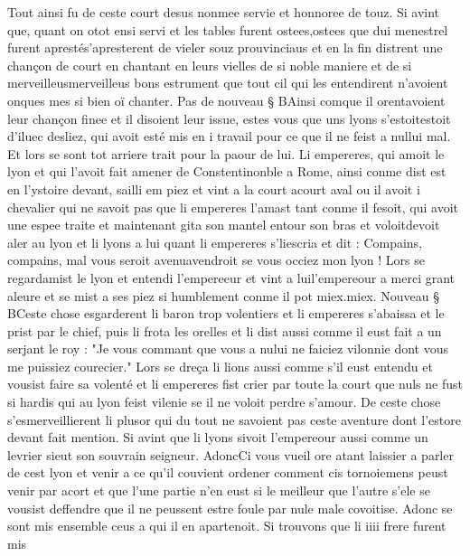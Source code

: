 \documentclass{article}
\begin{document}
\begin{pages}
   Tout ainsi fu de ceste court desus nonmee servie et honnoree de touz. 
   Si avint que, quant on otot ensi servi et les tables furent 
   ostees,ostees que
   dui menestrel furent aprestés'apresterent de vieler souz prouvinciaus 
   et en la fin distrent une chançon de court en chantant en leurs vielles de si noble maniere et 
   de si merveilleusmerveilleus bons estrument que tout cil qui les entendirent 
   n’avoient onques mes si bien oï chanter. \pend
\pstart Pas de nouveau § BAinsi 
   comque il orentavoient
   leur chançon finee et il disoient leur issue, estes vous que uns lyons 
   s’estoitestoit d'iluec desliez,
   qui avoit esté mis en i travail pour ce que il ne feist a nullui mal.
   Et lors se sont tot arriere trait pour la paour de lui.
   Li empereres, qui amoit 
   le lyon et qui l’avoit 
   fait amener de Constentinonble a Rome, 
   ainsi conme dist est en l’ystoire devant, sailli em piez et vint a la 
   court acourt aval ou il avoit i chevalier qui ne savoit pas que
   li empereres l’amast tant conme il fesoit,
   qui avoit une espee traite et maintenant gita son mantel entour son bras et
   voloitdevoit aler au lyon et
   li lyons a lui quant
   li empereres s’liescria et dit :
   Compains, compains, mal vous seroit avenuavendroit
      se vous occiez mon lyon
          !
   Lors se regardamist le lyon 
   et entendi l’empereeur et 
   vint a luil'empereour a merci grant aleure 
   et se mist a ses piez si humblement conme il pot 
   miex.miex. Nouveau § BCeste chose esgarderent
   li baron trop volentiers et li empereres s'abaissa et le prist par le chief, puis li frota les orelles et li dist aussi comme 
   il eust fait a un serjant le roy : "Je vous commant que vous a nului ne faiciez vilonnie dont vous me puissiez courecier." 
   Lors se dreça li lions aussi comme s'il eust entendu et vousist faire sa volenté et li empereres fist crier par toute la court 
   que nuls ne fust si hardis qui au lyon feist vilenie se il ne voloit perdre s'amour. De ceste chose s'esmerveillierent li plusor qui du tout
   ne savoient pas ceste aventure dont l'estore devant fait mention. Si avint que li lyons sivoit l'empereour aussi comme 
   un levrier sieut son souvrain seigneur. \pend
            \pstart AdoncCi vous vueil ore atant laissier a parler 
de cest lyon et venir a ce qu'il couvient ordener comment cis tornoiemens peust venir par acort et que l'une partie n'en eust 
si le meilleur que l'autre s'ele se vousist deffendre que il ne peussent estre foule par nule male covoitise. Adonc 
   se sont mis ensemble ceus a qui il en apartenoit. 
   Si trouvons que li iiii frere furent mis 

\end{pages}
\end{document}
